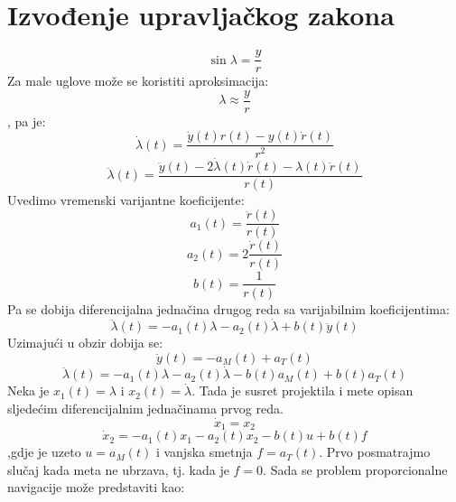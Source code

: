 \section{Izvođenje upravljačkog zakona}
\begin{equation}
    \sin{\lambda}=\frac{y}{r}
\end{equation}
Za male uglove može se koristiti aproksimacija:
\begin{equation}
    \lambda \approx \frac{y}{r}
\end{equation}
, pa je:
\begin{equation}
    \dot{\lambda}(t)=\frac{\dot{y}(t)r(t)-y(t)\dot{r}(t)}{r^2}
\end{equation}
\begin{equation}
    \ddot{\lambda}(t)=\frac{\ddot{y}(t)-2\dot{\lambda}(t)\dot{r}(t)-\lambda(t)\ddot{r}(t)}{r(t)}
\end{equation}
Uvedimo vremenski varijantne koeficijente:
\begin{equation}
    a_1(t)=\frac{\ddot{r}(t)}{r(t)}
\end{equation}
\begin{equation}
    a_2(t)=2\frac{\dot{r}(t)}{r(t)}
\end{equation}
\begin{equation}
    b(t)=\frac{1}{r(t)}
\end{equation}
Pa se dobija diferencijalna jednačina drugog reda sa varijabilnim koeficijentima:
\begin{equation}
    \ddot{\lambda}(t)=-a_1(t)\lambda-a_2(t)\dot{\lambda}+b(t)\ddot{y}(t)
\end{equation}
Uzimajući u obzir dobija se:
\begin{equation}
    \ddot{y}(t)=-a_M(t)+a_T(t)
\end{equation}
\begin{equation}
    \ddot{\lambda}(t)=-a_1(t)\lambda-a_2(t)\dot{\lambda}-b(t)a_M(t)+b(t)a_T(t)
\end{equation}
Neka je $x_1(t)=\lambda$ i $x_2(t)=\dot{\lambda}$. Tada je susret projektila i mete opisan sljedećim diferencijalnim jednačinama prvog reda.
\begin{equation}
    \dot{x}_1=x_2
    \label{eq:1}
\end{equation}
\begin{equation}
    \dot{x}_2=-a_1(t)x_1-a_2(t)x_2-b(t)u+b(t)f
    \label{eq:2}
\end{equation}
,gdje je uzeto $u=a_M(t)$ i vanjska smetnja $f=a_T(t)$.
Prvo posmatrajmo slučaj kada meta ne ubrzava, tj. kada je $f=0$. Sada se problem proporcionalne navigacije može predstaviti kao:
